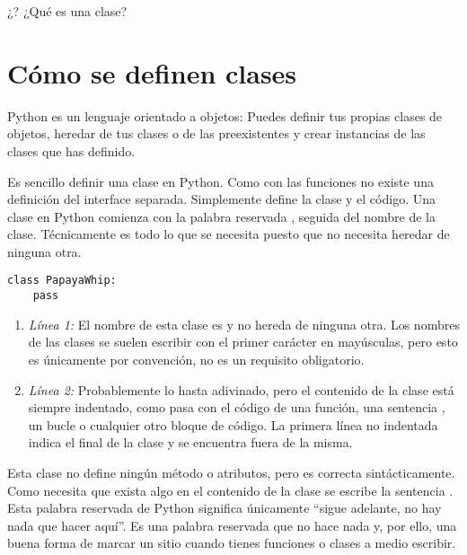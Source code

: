 ¿? ¿Qué es una clase?

\section{Cómo se definen clases}

Python es un lenguaje orientado a objetos: Puedes definir tus propias clases de objetos, heredar de tus clases o de las preexistentes y crear instancias de las clases que has definido.

Es sencillo definir una clase en Python. Como con las funciones no existe una definición del interface separada. Simplemente define la clase y el código. Una clase en Python comienza con la palabra reservada , seguida del nombre de la clase. Técnicamente es todo lo que se necesita puesto que no necesita heredar de ninguna otra.

\noindent\begin{minipage}{\textwidth}
\begin{lstlisting}[mathescape=True]
class PapayaWhip:
    pass
\end{lstlisting}
\end{minipage}

\begin{enumerate}

\item \emph{Línea 1:} El nombre de esta clase es  y no hereda de ninguna otra. Los nombres de las clases se suelen escribir con el primer carácter en mayúsculas,  pero esto es únicamente por convención, no es un requisito obligatorio.

\item \emph{Línea 2:} Probablemente lo hasta adivinado, pero el contenido de la clase está siempre indentado, como pasa con el código de una función, una sentencia , un bucle  o cualquier otro bloque de código. La primera línea no indentada indica el final de la clase y se encuentra fuera de la misma.

\end{enumerate}

Esta clase  no define ningún método o atributos, pero es correcta sintácticamente. Como necesita que exista algo en el contenido de la clase se escribe la sentencia . Esta palabra reservada de Python significa únicamente ``sigue adelante, no hay nada que hacer aquí''. Es una palabra reservada que no hace nada y, por ello, una buena forma de marcar un sitio cuando tienes funciones o clases a medio escribir.

